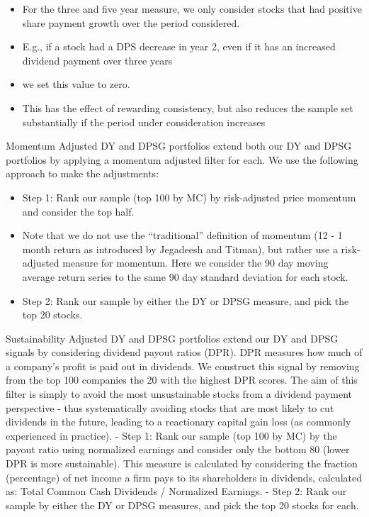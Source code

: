 \documentclass[11pt,preprint, authoryear]{elsarticle}
\numberwithin{equation}{section}
\numberwithin{figure}{section}
\numberwithin{table}{section}
\def\tightlist{} %
\begin{document}
\begin{itemize}
\tightlist
\item
  For the three and five year measure, we only consider stocks that had
  positive share payment growth over the period considered.
\item
  E.g., if a stock had a DPS decrease in year 2, even if it has an
  increased dividend payment over three years
\item
  we set this value to zero.
\item
  This has the effect of rewarding consistency, but also reduces the
  sample set substantially if the period under consideration increases
\end{itemize}

Momentum Adjusted DY and DPSG portfolios extend both our DY and DPSG
portfolios by applying a momentum adjusted filter for each. We use the
following approach to make the adjustments:

\begin{itemize}
\tightlist
\item
  Step 1: Rank our sample (top 100 by MC) by risk-adjusted price
  momentum and consider the top half.
\item
  Note that we do not use the ``traditional'' definition of momentum (12
  - 1 month return as introduced by Jegadeesh and Titman), but rather
  use a risk-adjusted measure for momentum. Here we consider the 90 day
  moving average return series to the same 90 day standard deviation for
  each stock.
\item
  Step 2: Rank our sample by either the DY or DPSG measure, and pick the
  top 20 stocks.
\end{itemize}

Sustainability Adjusted DY and DPSG portfolios extend our DY and DPSG
signals by considering dividend payout ratios (DPR). DPR measures how
much of a company's profit is paid out in dividends. We construct this
signal by removing from the top 100 companies the 20 with the highest
DPR scores. The aim of this filter is simply to avoid the most
unsustainable stocks from a dividend payment perspective - thus
systematically avoiding stocks that are most likely to cut dividends in
the future, leading to a reactionary capital gain loss (as commonly
experienced in practice). - Step 1: Rank our sample (top 100 by MC) by
the payout ratio using normalized earnings and consider only the bottom
80 (lower DPR is more sustainable). This measure is calculated by
considering the fraction (percentage) of net income a firm pays to its
shareholders in dividends, calculated as: Total Common Cash Dividends /
Normalized Earnings. - Step 2: Rank our sample by either the DY or DPSG
measures, and pick the top 20 stocks for each.
\end{document}
